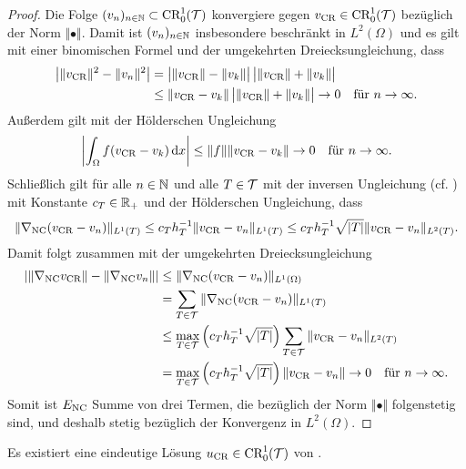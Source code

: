 \begin{proof}
  Die Folge $(v_n)_{n\in\mathbb{N}}\subset\textup{CR}^1_0(\mathcal{T})$ konvergiere
  gegen $v_\textup{CR}\in\textup{CR}^1_0(\mathcal{T})$ bezüglich der Norm $\Vert\bullet\Vert$.
  Damit ist $(v_n)_{n\in\mathbb{N}}$ insbesondere beschränkt in $L^2(\Omega)$ und es
  gilt mit einer binomischen Formel und der umgekehrten Dreiecksungleichung,
  dass
  \begin{align*}
    \left|\Vert v_\textup{CR}\Vert^2-\Vert v_n\Vert^2\right|
    &=
    \big|\Vert v_\textup{CR}\Vert-\Vert v_k\Vert\big|\, 
    \big|\Vert v_\textup{CR}\Vert+\Vert v_k\Vert\big|\\
    &\leq
    \Vert v_\textup{CR}- v_k\Vert\, \big|\Vert v_\textup{CR}\Vert+\Vert v_k\Vert\big|
    \to 0\quad\text{für }n\to\infty.
  \end{align*}
  Außerdem gilt mit der Hölderschen Ungleichung
  \begin{align*}
    \left|\int_\Omega f(v_\textup{CR}-v_k)\,\mathrm{d}x\right|
    \leq \Vert f\Vert \Vert v_\textup{CR}-v_k\Vert\to 0\quad\text{für }n\to\infty.
  \end{align*}
  Schließlich gilt für alle $n\in\mathbb{N}$ und alle $T\in\mathcal{T}$ mit der 
  inversen Ungleichung (cf. \cite[S. 53, Lemma 3.5]{Bar15})
  mit Konstante $c_T\in\mathbb{R}_+$ und der Hölderschen Ungleichung, dass
  \begin{equation*}
    \label{eq:continuityProofTriangleWiseEstimate}
    \Vert\nabla_\textup{NC}(v_\textup{CR}- v_n)\Vert_{L^1(T)}
    \leq
    c_T h_T^{-1}\Vert v_\textup{CR}- v_n\Vert_{L^1(T)}
    \leq
    c_T h_T^{-1}\sqrt{|T|}\Vert v_\textup{CR}- v_n\Vert_{L^2(T)}.
  \end{equation*}
  Damit folgt zusammen mit der umgekehrten Dreiecksungleichung
  \begin{align*}
    \left|\Vert\nabla_\textup{NC}v_\textup{CR}\Vert-\Vert \nabla_\textup{NC} v_n\Vert\right|
    &\leq 
    \Vert\nabla_\textup{NC}(v_\textup{CR}- v_n)\Vert_{L^1(\Omega)}\\
    &=
    \sum_{T\in\mathcal{T}}\Vert\nabla_\textup{NC}(v_\textup{CR}- v_n)\Vert_{L^1(T)}\\
    &\leq
    \max_{T\in\mathcal{T}}\left(c_T h_T^{-1}\sqrt{|T|}\right)
    \sum_{T\in\mathcal{T}}\Vert v_\textup{CR}- v_n\Vert_{L^2(T)}\\
    &=
    \max_{T\in\mathcal{T}}\left(c_T h_T^{-1}\sqrt{|T|}\right) \Vert v_\textup{CR}- v_n\Vert
    \to 0\quad\text{für }n\to\infty.
  \end{align*}
  Somit ist $E_\textup{NC}$ Summe von drei Termen, die bezüglich der Norm
  $\Vert\bullet\Vert$ folgenstetig sind, und deshalb stetig bezüglich der
  Konvergenz in $L^2(\Omega)$.
\end{proof}

\begin{theorem}
  \label{thm:discreteProblemExistenceUniqueness}
  Es existiert eine eindeutige Lösung $u_\textup{CR}\in\textup{CR}^1_0(\mathcal{T})$ von
  .
\end{theorem}

